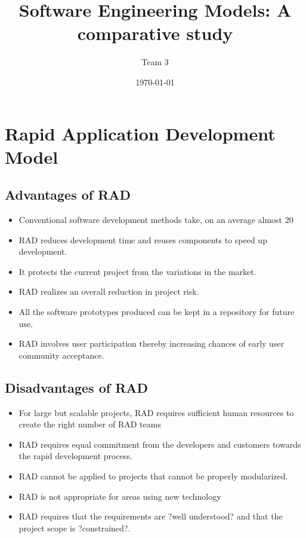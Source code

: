 \documentclass{article}
\begin{document}
\title{Software Engineering Models: A comparative study}

\author{Team 3}

\date{\today}

\maketitle

\newpage{}
\tableofcontents
\newpage{}

\newpage{}
\section{Rapid Application Development Model}
\subsection{Advantages of RAD}
\begin{itemize}
\item        Conventional software development methods take, on an average almost 20%
\item        RAD reduces development time and reuses components to speed up development.
\item        It protects the current project from the variations in the market.
\item        RAD realizes an overall reduction in project risk.
\item        All the software prototypes produced can be kept in a repository for future use.
\item        RAD involves user participation thereby increasing chances of early user community acceptance.
\end{itemize}

\subsection{Disadvantages of RAD}
\begin{itemize}
\item        For large but scalable projects, RAD requires sufficient human resources to create the right number of RAD teams
\item        RAD requires equal commitment from the developers and customers towards the rapid development process.
\item        RAD cannot be applied to projects that cannot be properly modularized.
\item        RAD is not appropriate for areas using new technology
\item        RAD requires that the requirements are ?well understood? and that the project scope is ?constrained?.
\end{itemize}
\end{document}
